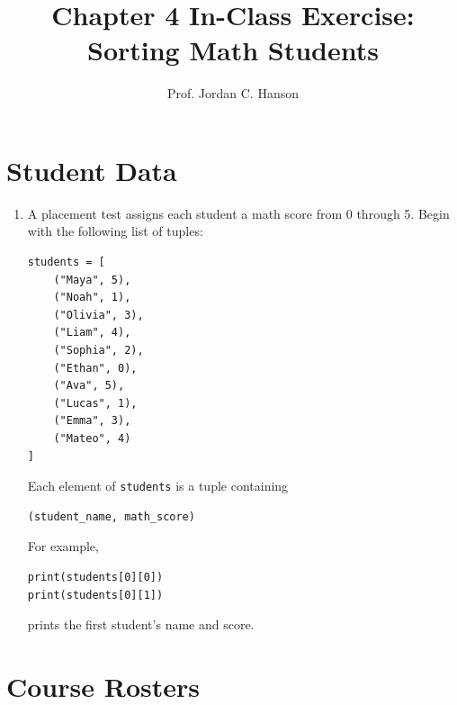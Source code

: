 \documentclass{article}
\begin{document}
\twocolumn

\title{Chapter 4 In-Class Exercise: Sorting Math Students}
\author{Prof. Jordan C. Hanson}
\date{}

\maketitle

\section{Student Data}

\begin{enumerate}

\item A placement test assigns each student a math score from
0 through 5.  Begin with the following list of tuples:

\begin{verbatim}
students = [
    ("Maya", 5),
    ("Noah", 1),
    ("Olivia", 3),
    ("Liam", 4),
    ("Sophia", 2),
    ("Ethan", 0),
    ("Ava", 5),
    ("Lucas", 1),
    ("Emma", 3),
    ("Mateo", 4)
]
\end{verbatim}

Each element of \texttt{students} is a tuple containing

\begin{verbatim}
(student_name, math_score)
\end{verbatim}

For example,

\begin{verbatim}
print(students[0][0])
print(students[0][1])
\end{verbatim}

prints the first student's name and score.

\end{enumerate}


\section{Course Rosters}
\end{document}
